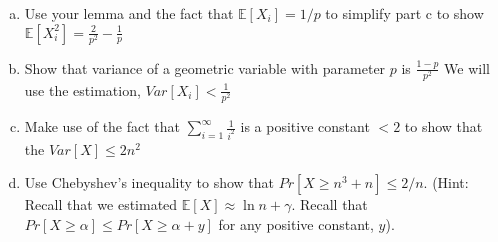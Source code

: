 \documentclass[11pt]{article}
\newif\ifsolutions
\begin{document}
\begin{enumerate}
\begin{enumerate}[a)]
\ifsolutions{\color{blue}{
By definition $\mathbb{E}[X_i^2] = \sum\nolimits_{k=1}^{\infty} k^2p(1-p)^{k-1}$ since $k^2 = k(k+1) - k$ we plug that in to get the answer 
}}\fi


\item Use your lemma and the fact that $\mathbb{E}[X_i] = 1/p$ to simplify part c to show $\mathbb{E}[X_i^2] = \frac{2}{p^2} - \frac{1}{p} $
\item Show that variance of a geometric variable with parameter $p$ is $\frac{1-p}{p^2}$ We will use the estimation, $Var[X_i] < \frac{1}{p^2}$
\item Make use of the fact that $\sum\nolimits_{i=1}^{\infty} \frac{1}{i^2}$ is a positive constant $<2$ to show that the $Var[X] \leq 2n^2$ 
\item Use Chebyshev's inequality to show that $Pr[ X \geq n^3 + n] \leq 2/n $. (Hint: Recall that we estimated $\mathbb{E}[X] \approx \ln{n} + \gamma$. Recall that $Pr[X \geq \alpha] \leq Pr[X \geq \alpha + y]$ for any positive constant, $y$).


\end{enumerate}


\end{enumerate}
\end{document}
